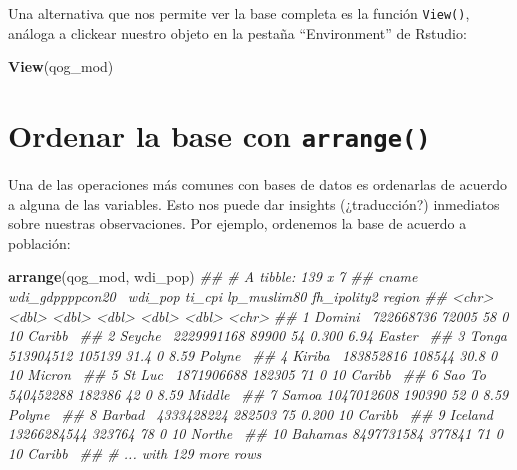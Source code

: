 \documentclass[]{book}
\newenvironment{Shaded}{\begin{snugshade}}{\end{snugshade}}
\newcommand{\CommentTok}[1]{\textcolor[rgb]{0.56,0.35,0.01}{\textit{#1}}}
\newcommand{\KeywordTok}[1]{\textcolor[rgb]{0.13,0.29,0.53}{\textbf{#1}}}
\newcommand{\NormalTok}[1]{#1}
\begin{document}
Una alternativa que nos permite ver la base completa es la función
\texttt{View()}, análoga a clickear nuestro objeto en la pestaña
``Environment'' de Rstudio:

\begin{Shaded}
\begin{Highlighting}[]
\KeywordTok{View}\NormalTok{(qog_mod)}
\end{Highlighting}
\end{Shaded}

\hypertarget{ordenar-la-base-con-arrange}{%
\section{\texorpdfstring{Ordenar la base con
\texttt{arrange()}}{Ordenar la base con arrange()}}\label{ordenar-la-base-con-arrange}}

Una de las operaciones más comunes con bases de datos es ordenarlas de
acuerdo a alguna de las variables. Esto nos puede dar insights
(¿traducción?) inmediatos sobre nuestras observaciones. Por ejemplo,
ordenemos la base de acuerdo a población:

\begin{Shaded}
\begin{Highlighting}[]
\KeywordTok{arrange}\NormalTok{(qog_mod, wdi_pop)}
\CommentTok{## # A tibble: 139 x 7}
\CommentTok{##    cname   wdi_gdppppcon20~ wdi_pop ti_cpi lp_muslim80 fh_ipolity2 region }
\CommentTok{##    <chr>              <dbl>   <dbl>  <dbl>       <dbl>       <dbl> <chr>  }
\CommentTok{##  1 Domini~        722668736   72005   58         0           10    Caribb~}
\CommentTok{##  2 Seyche~       2229991168   89900   54         0.300        6.94 Easter~}
\CommentTok{##  3 Tonga          513904512  105139   31.4       0            8.59 Polyne~}
\CommentTok{##  4 Kiriba~        183852816  108544   30.8       0           10    Micron~}
\CommentTok{##  5 St Luc~       1871906688  182305   71         0           10    Caribb~}
\CommentTok{##  6 Sao To~        540452288  182386   42         0            8.59 Middle~}
\CommentTok{##  7 Samoa         1047012608  190390   52         0            8.59 Polyne~}
\CommentTok{##  8 Barbad~       4333428224  282503   75         0.200       10    Caribb~}
\CommentTok{##  9 Iceland      13266284544  323764   78         0           10    Northe~}
\CommentTok{## 10 Bahamas       8497731584  377841   71         0           10    Caribb~}
\CommentTok{## # ... with 129 more rows}
\end{Highlighting}
\end{Shaded}
\end{document}
